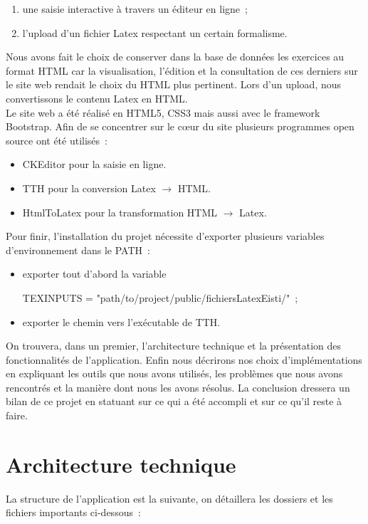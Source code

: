 \begin{enumerate}
\item une saisie interactive à travers un éditeur en ligne~;
\item l'upload d'un fichier Latex respectant un certain formalisme. 
\end{enumerate} 

Nous avons fait le choix de conserver dans la base de données les exercices au format HTML car la visualisation, l'édition et la consultation de ces derniers sur le site web rendait le choix du HTML plus pertinent. Lors d'un upload, nous convertissons le contenu Latex en HTML. \\

Le site web a été réalisé en HTML5, CSS3 mais aussi avec le framework Bootstrap. Afin de se concentrer sur le cœur du site plusieurs programmes open source ont été utilisés~:

\smallskip
\begin{itemize}
\item CKEditor pour la saisie en ligne.
\item TTH pour la conversion Latex $\rightarrow$ HTML.
\item HtmlToLatex pour la transformation HTML $\rightarrow$ Latex.
\end{itemize}

\medskip
Pour finir, l'installation du projet nécessite d'exporter plusieurs variables d'environnement dans le PATH~:

\begin{itemize}
\item exporter tout d'abord la variable 
\begin{center}
TEXINPUTS = "path/to/project/public/fichiersLatexEisti/"~;
\end{center}
\item exporter le chemin vers l'exécutable de TTH.
\end{itemize}

\medskip
On trouvera, dans un premier, l'architecture technique et la présentation des fonctionnalités de l'application. Enfin nous décrirons nos choix d'implémentations en expliquant les outils que nous avons utilisés, les problèmes que nous avons rencontrés et la manière dont nous les avons résolus. La conclusion dressera un bilan de ce projet en statuant sur ce qui a été accompli et sur ce qu'il reste à faire. 

\newpage
\section{Architecture technique}
La structure de l'application est la suivante, on détaillera les dossiers et les fichiers importants ci-dessous~:

